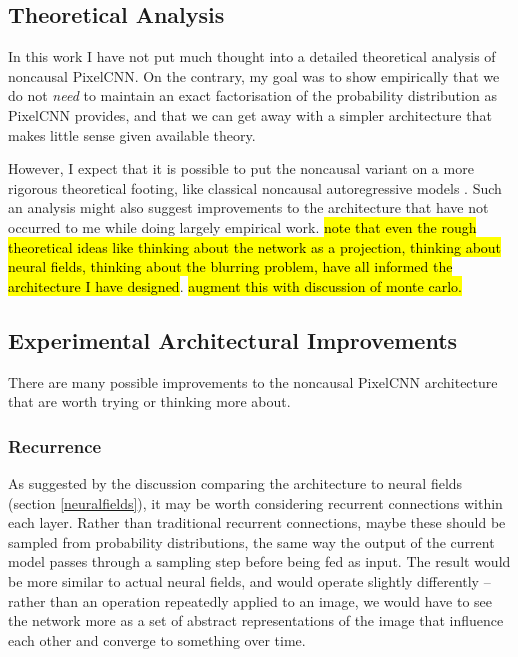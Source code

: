 \documentclass[10pt,a4paper]{article}
\begin{document}
\subsection{Theoretical Analysis}

In this work I have not put much thought into a detailed theoretical analysis of noncausal PixelCNN. On the contrary, my goal was to show empirically that we do not \emph{need} to maintain an exact factorisation of the probability distribution as PixelCNN provides, and that we can get away with a simpler architecture that makes little sense given available theory.

However, I expect that it is possible to put the noncausal variant on a more rigorous theoretical footing, like classical noncausal autoregressive models \citep{noncausalimage2,noncausaleco2}. Such an analysis might also suggest improvements to the architecture that have not occurred to me while doing largely empirical work. \hl{note that even the rough theoretical ideas like thinking about the network as a projection, thinking about neural fields, thinking about the blurring problem, have all informed the architecture I have designed}. \hl{augment this with discussion of monte carlo.}

\subsection{Experimental Architectural Improvements}

There are many possible improvements to the noncausal PixelCNN architecture that are worth trying or thinking more about.

\subsubsection{Recurrence}

As suggested by the discussion comparing the architecture to neural fields (section \ref{neuralfields}), it may be worth considering recurrent connections within each layer. Rather than traditional recurrent connections, maybe these should be sampled from probability distributions, the same way the output of the current model passes through a sampling step before being fed as input. The result would be more similar to actual neural fields, and would operate slightly differently -- rather than an operation repeatedly applied to an image, we would have to see the network more as a set of abstract representations of the image that influence each other and converge to something over time.
\end{document}
